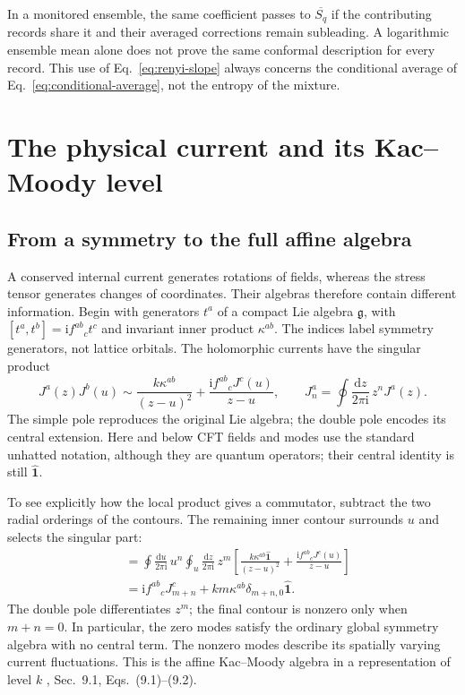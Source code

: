 \documentclass[aps,prb,onecolumn,nofootinbib,superscriptaddress]{revtex4-2}
\newcommand{\One}{\hat{\mathbf{1}}}
\newcommand{\dd}{\mathrm{d}}
\newcommand{\ii}{\mathrm{i}}
\begin{document}
In a monitored ensemble, the same coefficient passes to
$\overline{S_q}$ if the contributing records share it and their averaged
corrections remain subleading. A logarithmic ensemble mean alone does not
prove the same conformal description for every record. This use of
Eq.~\eqref{eq:renyi-slope} always concerns the conditional average of
Eq.~\eqref{eq:conditional-average}, not the entropy of the mixture.

\section{The physical current and its Kac--Moody level}
\label{sec:current}
\subsection{From a symmetry to the full affine algebra}
A conserved internal current generates rotations of fields, whereas the
stress tensor generates changes of coordinates. Their algebras therefore
contain different information. Begin with generators $t^a$ of a compact
Lie algebra $\mathfrak g$, with
$[t^a,t^b]=\ii f^{ab}{}_ct^c$ and invariant inner product $\kappa^{ab}$.
The indices label symmetry generators, not lattice orbitals. The
holomorphic currents have the singular product
\begin{equation}
 J^a(z)J^b(u)\sim
 \frac{k\kappa^{ab}}{(z-u)^2}
 +\frac{\ii f^{ab}{}_cJ^c(u)}{z-u},\qquad
 J_n^a=\oint\frac{\dd z}{2\pi\ii}\,z^nJ^a(z).
 \label{eq:nonabelian-ope}
\end{equation}
The simple pole reproduces the original Lie algebra; the double pole
encodes its central extension. Here and below CFT fields and modes use
the standard unhatted notation, although they are quantum operators;
their central identity is still $\One$.

To see explicitly how the local product gives a commutator, subtract the
two radial orderings of the contours. The remaining inner contour
surrounds $u$ and selects the singular part:
\begin{align}
 [J_m^a,J_n^b]
 &=\oint\frac{\dd u}{2\pi\ii}\,u^n
   \oint_u\frac{\dd z}{2\pi\ii}\,z^m
     \left[\frac{k\kappa^{ab}\One}{(z-u)^2}
          +\frac{\ii f^{ab}{}_cJ^c(u)}{z-u}\right]\nonumber\\
 &=\ii f^{ab}{}_cJ^c_{m+n}
       +k m\kappa^{ab}\delta_{m+n,0}\One.
 \label{eq:full-km}
\end{align}
The double pole differentiates $z^m$; the final contour is nonzero only
when $m+n=0$. In particular, the zero modes satisfy the ordinary global
symmetry algebra with no central term. The nonzero modes describe its
spatially varying current fluctuations. This is the affine Kac--Moody
algebra in a representation of level $k$
\cite{Ginsparg1989}, Sec.~9.1, Eqs.~(9.1)--(9.2).
\end{document}

